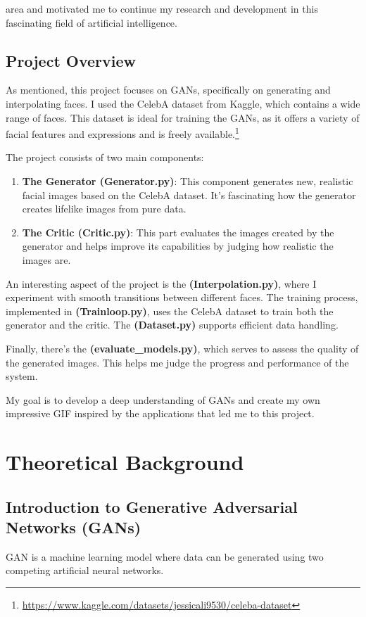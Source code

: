 \documentclass[a4paper, 12pt]{article}
\begin{document}
 area and motivated me to continue my research and development in this fascinating field of artificial intelligence.

\subsection{Project Overview}
As mentioned, this project focuses on GANs, specifically on generating and interpolating faces. I used the CelebA dataset from Kaggle, which contains a wide range of faces. This dataset is ideal for training the GANs, as it offers a variety of facial features and expressions and is freely available.\footnote{\url{https://www.kaggle.com/datasets/jessicali9530/celeba-dataset}}

The project consists of two main components:
\begin{enumerate}
  \item \textbf{The Generator (Generator.py)}: This component generates new, realistic facial images based on the CelebA dataset. It's fascinating how the generator creates lifelike images from pure data.
  \item \textbf{The Critic (Critic.py)}: This part evaluates the images created by the generator and helps improve its capabilities by judging how realistic the images are.
\end{enumerate}

An interesting aspect of the project is the \textbf{(Interpolation.py)}, where I experiment with smooth transitions between different faces. The training process, implemented in \textbf{(Trainloop.py)}, uses the CelebA dataset to train both the generator and the critic. The \textbf{(Dataset.py)} supports efficient data handling.

Finally, there's the \textbf{(evaluate\_models.py)}, which serves to assess the quality of the generated images. This helps me judge the progress and performance of the system.

My goal is to develop a deep understanding of GANs and create my own impressive GIF inspired by the applications that led me to this project.

\section{Theoretical Background}
\subsection{Introduction to Generative Adversarial Networks (GANs)}
GAN is a machine learning model where data can be generated using two competing artificial neural networks.\cite{youtube_gans}
\end{document}
